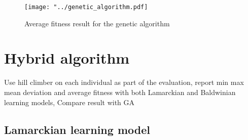 \documentclass{article}
\begin{document}
\begin{figure}[H]
\begin{center}
\texttt{[image: "../genetic\_algorithm.pdf]}
\caption{Average fitness result for the genetic algorithm}
\end{center}
\end{figure}

\section{Hybrid algorithm}
Use hill climber on each individual as part of the evaluation, report min max mean deviation and average fitness with both Lamarckian and Baldwinian learning models, Compare result with GA
\subsection{Lamarckian learning model}
\end{document}
